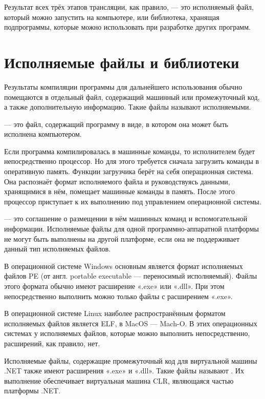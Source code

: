 Результат всех трёх этапов трансляции, как правило, — это исполняемый
файл, который можно запустить на компьютере, или библиотека, хранящая
подпрограммы, которые можно использовать при разработке других
программ.

\section{Исполняемые файлы и библиотеки}


Результаты компиляции программы для дальнейшего использования обычно
помещаются в отдельный файл, содержащий машинный или промежуточный
код, а также дополнительную информацию. Такие файлы называют
исполняемыми.

\begin{defn}
   — это файл, содержащий
  программу в виде, в котором она может быть исполнена компьютером.
\end{defn}

Если программа компилировалась в машинные команды, то исполнителем
будет непосредственно процессор. Но для этого требуется сначала
загрузить команды в оперативную память. Функции загрузчика берёт на
себя операционная система. Она распознаёт формат исполняемого файла и
руководствуясь данными, хранящимися в нём, помещает машинные команды в
память. После этого процессор приступает к их выполнению под
управлением операционной системы.

 — это
соглашение о размещении в нём машинных команд и вспомогательной
информации. Исполняемые файлы для одной программно-аппаратной
платформы не могут быть выполнены на другой платформе, если она не
поддерживает данный тип исполняемых файлов.

В операционной системе Windows основным является формат исполняемых
файлов PE (от англ. portable executable — переносимый
исполняемый). Файлы этого формата обычно имеют расширение «.exe» или
«.dll». При этом непосредственно выполнить можно только файлы с
расширением «.exe».

В операционной системе Linux наиболее распространённым форматом
исполняемых файлов является ELF, в MacOS — Mach-O. В этих операционных
системах у исполняемых файлов, которые можно выполнить
непосредственно, расширений, как правило, нет.

Исполняемые файлы, содержащие промежуточный код для виртуальной машины
.NET также имеют расширения «.exe» и «.dll». Такие файлы называют
. Их выполнение обеспечивает виртуальная
машина CLR, являющаяся частью платформы .NET.


